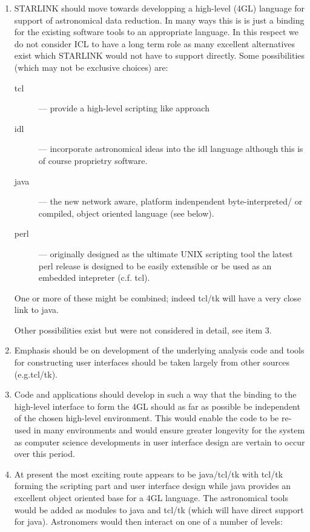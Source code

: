 \begin{enumerate}
\item STARLINK should move towards developping a high-level (4GL) language for
support of astronomical data reduction.  In many ways this is is just
a binding for the existing software tools to an appropriate language.
In this respect we do not consider ICL to have a long term role as
many excellent alternatives exist which STARLINK would not have to
support directly.  Some possibilities (which may not be exclusive
choices) are:

\begin{description}
\item[tcl] --- provide a high-level scripting like approach
\item[idl]  --- incorporate astronomical ideas into the idl language
although this is of course proprietry software.
\item[java] --- the new network aware, platform indenpendent byte-interpreted/
or compiled, object oriented language (see below).
\item[perl] --- originally designed as the ultimate UNIX scripting tool
the latest perl release is designed to be easily extensible or be used
as an embedded intepreter (c.f. tcl).
\end{description}

One or more of these might be combined; indeed tcl/tk will have a very
close link to java.

Other possibilities exist but were not considered in detail, see item
3.

\item Emphasis should be on development of the underlying analysis code
and tools for constructing user interfaces should be taken largely
from other sources (e.g.tcl/tk).

\item Code and applications should develop in such a way that the binding to
the high-level interface to form the 4GL should as far as possible be
independent of the chosen high-level environment.  This would enable
the code to be re-used in many environments and would ensure greater
longevity for the system as computer science developments in user
interface design are vertain to occur over this period.

\item At present the most exciting route appears to be java/tcl/tk with
tcl/tk forming the scripting part and user interface design while java
provides an excellent object oriented base for a 4GL language.  The
astronomical tools would be added as modules to java and tcl/tk (which
will have direct support for java).  Astronomers would then interact
on one of a number of levels:


\end{enumerate}
